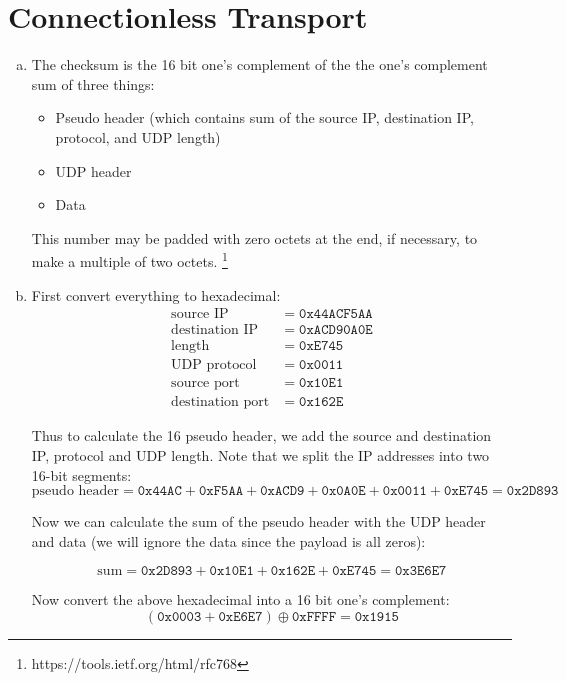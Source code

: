 \documentclass[11pt]{article}
\begin{document}
\section*{Connectionless Transport}
  \begin{enumerate}[(a)]
    \item
      The checksum is the 16 bit one's complement of the the one's complement sum of
      three things:
      \begin{itemize}
        \item Pseudo header (which contains sum of the source IP, destination IP, protocol, and UDP length)
        \item UDP header
        \item Data
      \end{itemize}

      This number may be padded with zero octets at the end, if necessary, to make
      a multiple of two octets. \footnote{https://tools.ietf.org/html/rfc768}
    \item
      First convert everything to hexadecimal:
      \begin{align*}
        \text{source IP} &= \mathtt{0x44ACF5AA} \\
        \text{destination IP} &= \mathtt{0xACD90A0E} \\
        \text{length} &= \mathtt{0xE745} \\
        \text{UDP protocol} &= \mathtt{0x0011} \\
        \text{source port} &= \mathtt{0x10E1} \\
        \text{destination port} &= \mathtt{0x162E}
      \end{align*}

      Thus to calculate the 16 pseudo header, we add the source and destination IP,
      protocol and UDP length. Note that we split the IP addresses into two 16-bit
      segments:
      \[ \text{pseudo header} = \mathtt{0x44AC} + \mathtt{0xF5AA} + \mathtt{0xACD9}
       + \mathtt{0x0A0E} + \mathtt{0x0011}+ \mathtt{0xE745} = \mathtt{0x2D893} \]

      Now we can calculate the sum of the pseudo header with the UDP header and data
      (we will ignore the data since the payload is all zeros):

      \[ \text{sum} = \mathtt{0x2D893} + \mathtt{0x10E1} + \mathtt{0x162E}
      + \mathtt{0xE745} = \mathtt{0x3E6E7} \]

      Now convert the above hexadecimal into a 16 bit one's complement:
      \[ (\mathtt{0x0003} + \mathtt{0xE6E7}) \oplus \mathtt{0xFFFF} = \boxed{\mathtt{0x1915}} \]


\end{enumerate}
\end{document}
